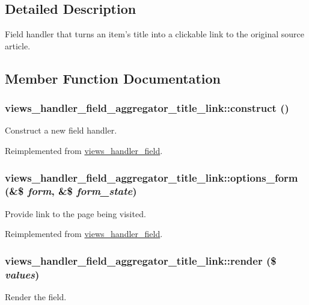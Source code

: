 \subsection{Detailed Description}
Field handler that turns an item's title into a clickable link to the original source article. 

\subsection{Member Function Documentation}
\hypertarget{classviews__handler__field__aggregator__title__link_abcde91e341b70cc842fec304c7de8376}{
\subsubsection[{construct}]{\setlength{\rightskip}{0pt plus 5cm}views\_\-handler\_\-field\_\-aggregator\_\-title\_\-link::construct ()}}
\label{classviews__handler__field__aggregator__title__link_abcde91e341b70cc842fec304c7de8376}
Construct a new field handler. 

Reimplemented from \hyperlink{classviews__handler__field_a3d50050864c255b71c842972a45d39f6}{views\_\-handler\_\-field}.\hypertarget{classviews__handler__field__aggregator__title__link_a6ebe6b2dc8c306fc32258be795f21f3b}{
\subsubsection[{options\_\-form}]{\setlength{\rightskip}{0pt plus 5cm}views\_\-handler\_\-field\_\-aggregator\_\-title\_\-link::options\_\-form (\&\$ {\em form}, \/  \&\$ {\em form\_\-state})}}
\label{classviews__handler__field__aggregator__title__link_a6ebe6b2dc8c306fc32258be795f21f3b}
Provide link to the page being visited. 

Reimplemented from \hyperlink{classviews__handler__field_a0435d161922b7b4b84f02a2e79bb947a}{views\_\-handler\_\-field}.\hypertarget{classviews__handler__field__aggregator__title__link_a1b3d319f7a95e1885726a975f1755b9f}{
\subsubsection[{render}]{\setlength{\rightskip}{0pt plus 5cm}views\_\-handler\_\-field\_\-aggregator\_\-title\_\-link::render (\$ {\em values})}}
\label{classviews__handler__field__aggregator__title__link_a1b3d319f7a95e1885726a975f1755b9f}
Render the field.


